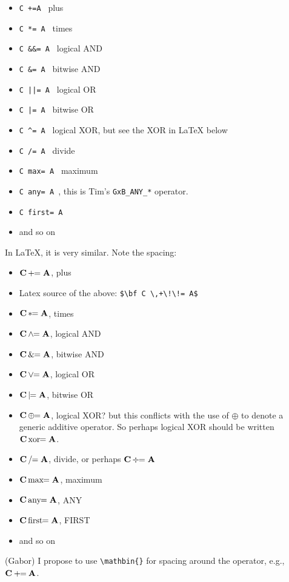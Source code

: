 \documentclass[11pt]{article}
\begin{document}
    \begin{itemize}
    \item[] \verb'C +=A ' plus
    \item[] \verb'C *= A ' times
    \item[] \verb'C &&= A ' logical AND
    \item[] \verb'C &= A ' bitwise AND
    \item[] \verb'C ||= A ' logical OR
    \item[] \verb'C |= A ' bitwise OR
    \item[] \verb'C ^= A ' logical XOR, but see the XOR in LaTeX below
    \item[] \verb'C /= A ' divide
    \item[] \verb'C max= A ' maximum
    \item[] \verb'C any= A ', this is Tim's \verb'GxB_ANY_*' operator.
    \item[] \verb'C first= A '
    \item[] and so on
    \end{itemize}

In LaTeX, it is very similar.  Note the spacing:

    \begin{itemize}
    \item[] $\bf C \,+\!\!= A $, plus
    \item[] Latex source of the above: \verb'$\bf C \,+\!\!= A$'
    \item[] $\bf C \,*\!\!= A $, times
    \item[] $\bf C \,\wedge\!\!= A $, logical AND
    \item[] $\bf C \,\&\!\!= A $, bitwise AND
    \item[] $\bf C \,\vee\!\!= A $, logical OR
    \item[] $\bf C \,|\!\!= A $, bitwise OR
    \item[] $\bf C \,\oplus\!\!= A $, logical XOR?  but this conflicts with
        the use of $\oplus$ to denote a generic additive operator.
        So perhaps logical XOR should be written
        $\bf C \,\mbox{xor}\!\!= A $.
    \item[] $\bf C \,/\!\!= A $, divide, or perhaps
        $\bf C \,\div\!\!= A $
    \item[] $\bf C \,\mbox{max}\!\!= A $, maximum
    \item[] $\bf C \,\mbox{any}\!\!= A $, ANY
    \item[] $\bf C \,\mbox{first}\!\!= A $, FIRST
    \item[] and so on
    \end{itemize}

(Gabor) I propose to use \verb+\mathbin{}+ for spacing around the operator, e.g., $\bf C \mathbin{+\!\!=} A $.
\end{document}
